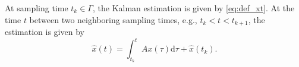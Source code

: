 \documentclass[12pt]{article}
\newcommand{\ra}{{\rightarrow}}
\newcommand{\ift}{{\infty}}
\newcommand{\rd}{{\mathrm{d}}}
\begin{document}
%


%
At sampling time $t_k\in\Gamma$, the Kalman estimation is given by \eqref{eq:def_xt}.
At the time $t$ between two neighboring sampling times, e.g., $t_k<t<t_{k+1}$, the estimation is given by 
\begin{equation*}
\hat{x}(t)=\int_{t_{k}}^{t} A x(\tau) \rd \tau + \hat{x}(t_{k}).
\end{equation*}
\end{document}
